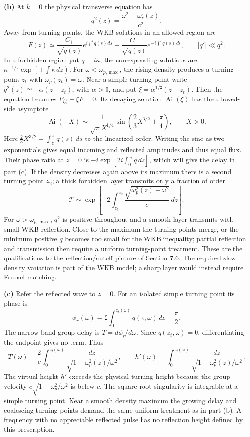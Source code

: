 \textbf{(b)} At $k=0$ the physical transverse equation has
\[
q^2(z)=\frac{\omega^2-\omega_p^2(z)}{c^2}.
\]
Away from turning points, the WKB solutions in an allowed region are
\[
F(z)\simeq\frac{C_+}{\sqrt{q(z)}}
 e^{i\int^z q(s)\,ds}+
\frac{C_-}{\sqrt{q(z)}}e^{-i\int^z q(s)\,ds},
\qquad |q'|\ll q^2.
\]
In a forbidden region put $q=i\kappa$; the corresponding solutions
are $\kappa^{-1/2}\exp(\pm\int\kappa\,dz)$. For
$\omega<\omega_{p,\max}$, the rising density produces a turning
point $z_t$ with $\omega_p(z_t)=\omega$.  Near a simple turning
point write $q^2(z)\simeq-\alpha(z-z_t)$, with $\alpha>0$, and put
$\xi=\alpha^{1/3}(z-z_t)$.  Then the equation becomes
$F_{\xi\xi}-\xi F=0$.  Its decaying solution $\operatorname{Ai}(\xi)$
has the allowed-side asymptote
\[
\operatorname{Ai}(-X)\sim\frac1{\sqrt\pi X^{1/4}}
\sin\left(\frac23X^{3/2}+\frac\pi4\right),\qquad X>0.
\]
Here $\tfrac23X^{3/2}=\int_z^{z_t}q(s)\,ds$ to the linearized
order.  Writing the sine as two exponentials gives equal
incoming and reflected amplitudes and thus equal flux.  Their
phase ratio at $z=0$ is
$-i\exp[2i\int_0^{z_t}q\,dz]$, which will give the delay in part (c). If the density decreases again
above its maximum there is a second turning point $z_2$; a thick
forbidden layer transmits only a fraction of order
\[
\mathcal T\sim\exp\left[-2\int_{z_t}^{z_2}
 \frac{\sqrt{\omega_p^2(z)-\omega^2}}c\,dz\right].
\]
For $\omega>\omega_{p,\max}$, $q^2$ is positive throughout and a
smooth layer transmits with small WKB reflection. Close to the
maximum the turning points merge, or the minimum positive $q$
becomes too small for the WKB inequality; partial reflection and
transmission then require a uniform turning-point treatment.
These are the qualifications to the reflection/cutoff picture of
Section 7.6. The required slow density variation is part of the WKB
model; a sharp layer would instead require Fresnel matching.

\textbf{(c)} Refer the reflected wave to $z=0$. For an isolated
simple turning point its phase is
\[
\phi_r(\omega)=2\int_0^{z_t(\omega)}q(z,\omega)\,dz-\frac\pi2.
\]
The narrow-band group delay is $T=d\phi_r/d\omega$. Since
$q(z_t,\omega)=0$, differentiating the endpoint gives no term.
Thus
\[
\boxed{T(\omega)=\frac2c\int_0^{z_t(\omega)}
\frac{dz}{\sqrt{1-\omega_p^2(z)/\omega^2}},\qquad
h'(\omega)=\int_0^{z_t(\omega)}
\frac{dz}{\sqrt{1-\omega_p^2(z)/\omega^2}}.}
\]
The virtual height $h'$ exceeds the physical turning height because
the group velocity $c\sqrt{1-\omega_p^2/\omega^2}$ is below $c$.
The square-root singularity is integrable at a simple turning
point. Near a smooth density maximum the growing delay and
coalescing turning points demand the same uniform treatment as in
part (b). A frequency with no appreciable reflected pulse has no
reflection height defined by this prescription.

